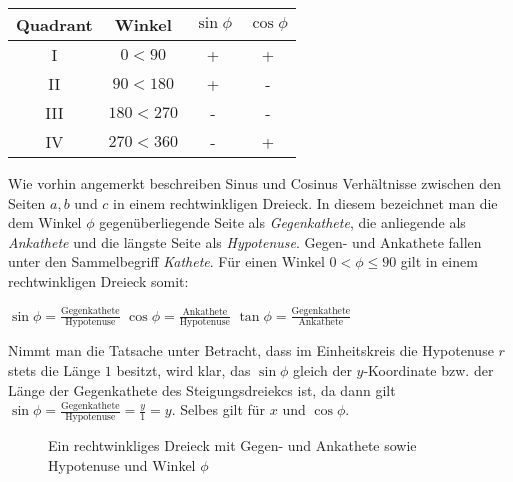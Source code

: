 \begin{table}[h!]
	\begin{tabular}{c | c | c | c}
		Quadrant & Winkel & $\sin \phi$ & $\cos \phi$
		\\ \hline
		I & $0 < 90$ & + & +
		\\ 
		II & $90 < 180$ & + & -
		\\
		III & $180 < 270$ & - & -
		\\
		IV & $270 < 360$ & - & +
		\\
	\end{tabular}
\end{table}

\pagebreak


Wie vorhin angemerkt beschreiben Sinus und Cosinus Verh\"{a}ltnisse zwischen den Seiten $a, b$ und $c$ in einem rechtwinkligen Dreieck. In diesem bezeichnet man die dem Winkel $\phi$ gegen\"{u}berliegende Seite als \emph{Gegenkathete}, die anliegende als \emph{Ankathete} und die l\"{a}ngste Seite als \emph{Hypotenuse}. Gegen- und Ankathete fallen unter den Sammelbegriff \emph{Kathete}. F\"{u}r einen Winkel $0 < \phi \leq 90$ gilt in einem rechtwinkligen Dreieck somit:

\begin{center}
$\sin \phi = \frac{\text{Gegenkathete}}{\text{Hypotenuse}}$
\hspace{1cm}
$\cos \phi = \frac{\text{Ankathete}}{\text{Hypotenuse}}$
\hspace{1cm}
$\tan \phi = \frac{\text{Gegenkathete}}{\text{Ankathete}}$
\end{center}

Nimmt man die Tatsache unter Betracht, dass im Einheitskreis die Hypotenuse $r$ stets die L\"{a}nge $1$ besitzt, wird klar, das $\sin \phi$ gleich der $y$-Koordinate bzw. der L\"{a}nge der Gegenkathete des Steigungsdreiekcs ist, da dann gilt $\sin \phi = \frac{\text{Gegenkathete}}{\text{Hypotenuse}} = \frac{y}{1} = y$. Selbes gilt f\"{u}r $x$ und $\cos \phi$.


\begin{figure}[h!]
	\caption*{Ein rechtwinkliges Dreieck mit Gegen- und Ankathete sowie Hypotenuse und Winkel $\phi$}
\end{figure}

